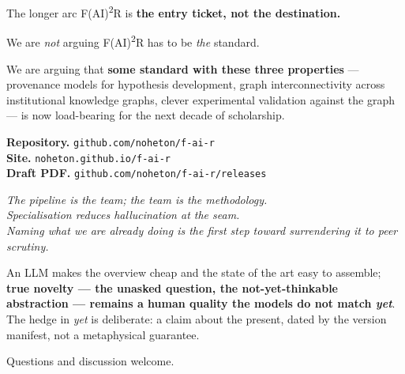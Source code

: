 \documentclass[aspectratio=169,11pt]{beamer}
\begin{document}
\begin{frame}{The longer arc}
  F(AI)\textsuperscript{2}R is \textbf{the entry ticket, not the destination.}

  \vspace{0.4em}
  We are \emph{not} arguing F(AI)\textsuperscript{2}R has to be \emph{the} standard.

  \vspace{0.4em}
  We are arguing that \textbf{some standard with these three properties} ---
  provenance models for hypothesis development,
  graph interconnectivity across institutional knowledge graphs,
  clever experimental validation against the graph ---
  is now load-bearing for the next decade of scholarship.
\end{frame}



\begin{frame}{}
  \textbf{Repository.} \texttt{github.com/noheton/f-ai-r}\\
  \textbf{Site.} \texttt{noheton.github.io/f-ai-r}\\
  \textbf{Draft PDF.} \texttt{github.com/noheton/f-ai-r/releases}

  \vspace{0.6em}
  \emph{The pipeline is the team; the team is the methodology.}\\
  \emph{Specialisation reduces hallucination at the seam.}\\
  \emph{Naming what we are already doing is the first step toward surrendering it to peer scrutiny.}

  \vspace{0.6em}
  An LLM makes the overview cheap and the state of the art easy to assemble;
  \textbf{true novelty --- the unasked question, the not-yet-thinkable
  abstraction --- remains a human quality the models do not match \emph{yet}}.
  The hedge in \emph{yet} is deliberate: a claim about the present, dated by
  the version manifest, not a metaphysical guarantee.

  \vspace{0.6em}
  Questions and discussion welcome.
\end{frame}

\end{document}
